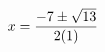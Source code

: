 \documentclass[preview]{standalone}
\begin{document}
\begin{align*}
\special{dvisvgm:raw <g id='unique000'>}x=\frac{-7\pm\sqrt{13}}{2(1)}\special{dvisvgm:raw </g>}
\end{align*}
\end{document}
